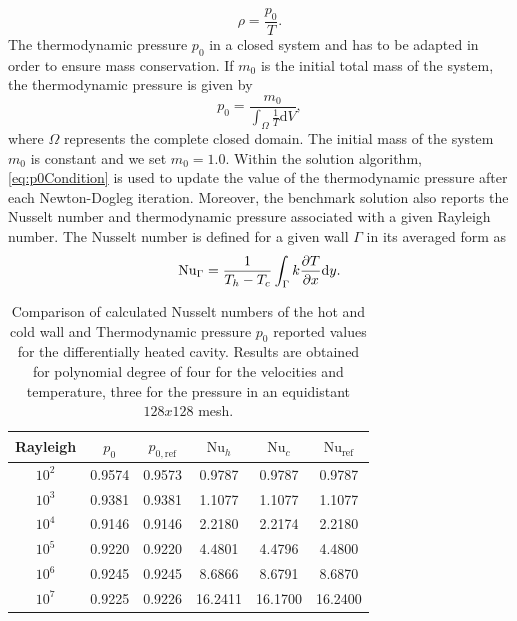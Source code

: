 \begin{equation}
\rho = \frac{p_0}{T}.
\end{equation}
The thermodynamic pressure $p_0$ in a closed system and has to be adapted in order to ensure mass conservation. If $m_0$ is the initial total mass of the system, the thermodynamic pressure is given by
\begin{equation}
p_0 = \frac{m_0}{\int_\Omega \frac{1}{T}\text{d}V}, \label{eq:p0Condition}
\end{equation}
where $\Omega$ represents the complete closed domain. The initial mass of the system $m_0$ is constant and we set $m_0 = 1.0$. Within the solution algorithm, \cref{eq:p0Condition} is used to update the value of the thermodynamic pressure after each Newton-Dogleg iteration.
Moreover, the benchmark solution \cite{vierendeelsBenchmarkSolutionsNatural2003} also reports the Nusselt number and thermodynamic pressure associated with a given Rayleigh number. The Nusselt number is defined for a given wall $\Gamma$ in its averaged form as 
\begin{equation}\label{eq:Nusselt}
\text{Nu}_\Gamma = \frac{1}{T_h - T_c}\int_{\Gamma} k \frac{\partial T}{\partial x}\text{d}y.
\end{equation}\begin{table}[t]
	\begin{center}
		\begin{tabular}{cccccc}
			\hline
			Rayleigh & $p_0$ &  $p_{0,\text{ref}}$  &$\text{Nu}_{h}$ & $\text{Nu}_{c}$& $\text{Nu}_{\text{ref}}$ \\ \hline
			\parbox[0pt][13pt][c]{0pt}{}$10^2$   & 0.9574 & 0.9573 & 0.9787    & 0.9787 & 0.9787      \\
			$10^3$   & 0.9381 & 0.9381 & 1.1077    & 1.1077  & 1.1077      \\
			$10^4$   & 0.9146 & 0.9146 & 2.2180    & 2.2174  & 2.2180      \\
			$10^5$   & 0.9220 & 0.9220 & 4.4801    & 4.4796   & 4.4800      \\
			$10^6$   & 0.9245 & 0.9245 & 8.6866    & 8.6791  & 8.6870      \\
			$10^7$   & 0.9225 & 0.9226 & 16.2411   & 16.1700 & 16.2400     \\ \hline
		\end{tabular}
	\end{center}
	\caption[Differentially heated cavity: Results of Nusselt number and Thermodynamic pressure]{Comparison of calculated Nusselt numbers of the hot and cold wall and Thermodynamic pressure $p_0$ reported values\cite{vierendeelsBenchmarkSolutionsNatural2003} for the differentially heated cavity. Results are obtained for polynomial degree of four for the velocities and temperature, three for the pressure in an equidistant $128x128$ mesh.}
	\label{tab:p0_Nu_Results}
\end{table}
